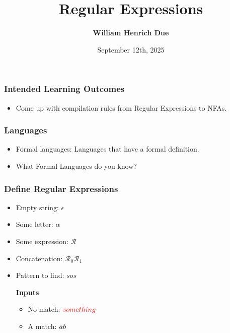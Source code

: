 \documentclass[aspectratio=169]{beamer}
\title[Hash Maps]{Regular Expressions}
\author{\textbf{William Henrich Due} \inst{1}}
\institute[shortinst]{\inst{1} Department of Computer Science}
\date{September 12th, 2025}
\begin{document}
\begin{frame}
  \begin{center}
    \titlepage
    \vfill
  \end{center}
\end{frame}

\begin{frame}\frametitle{Intended Learning Outcomes}
  \begin{itemize}
    \item Come up with compilation rules from Regular Expressions to NFAs.
  \end{itemize}
\end{frame}

\begin{frame}\frametitle{Languages}
  \begin{itemize}
    \item Formal languages: Languages that have a formal definition.
    \item What Formal Languages do you know?
  \end{itemize}
\end{frame}

\begin{frame}\frametitle{Define Regular Expressions}
  
  \begin{itemize}
    \item Empty string: $\epsilon$
    \item Some letter: $\alpha$
    \item Some expression: $\mathcal{R}$
    \item Concatenation: $\mathcal{R}_0\mathcal{R}_1$
    \item Pattern to find: $sos$
    
    \vspace{10pt}
    \textbf{Inputs}
    \begin{itemize}
      \item No match: ${\color{red} something}$
      \item A match: $ab{\color{green}}$
    \end{itemize}
  \end{itemize}
\end{frame}
\end{document}
